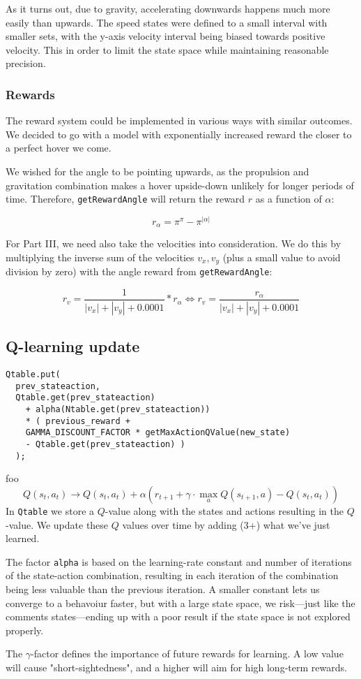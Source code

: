 As it turns out, due to gravity, accelerating downwards happens much more easily than upwards. The speed states were defined to a small interval with smaller sets, with the y-axis velocity interval being biased towards positive velocity. This in order to limit the state space while maintaining reasonable precision.

\subsubsection{Rewards}
The reward system could be implemented in various ways with similar outcomes. We decided to go with a model with exponentially increased reward the closer to a perfect hover we come.

We wished for the angle to be pointing upwards, as the propulsion and gravitation combination makes a hover upside-down unlikely for longer periods of time. Therefore, \verb=getRewardAngle= will return the reward $r$ as a function of $\alpha$:

$$ r_{\alpha} = \pi^{\pi} - \pi^{|\alpha|} $$

For Part III, we need also take the velocities into consideration. We do this by multiplying the inverse sum of the velocities $v_x,v_y$ (plus a small value to avoid division by zero) with the angle reward from \verb=getRewardAngle=:

$$ r_{v} = \frac{1}{|v_x|+|v_y|+0.0001}*r_{\alpha} \Leftrightarrow r_v = \frac{r_{\alpha}}{|v_x|+|v_y|+0.0001} $$

\subsection{Q-learning update}
\lstset{language=Java,numbers=left,breaklines=true,breakatwhitespace=true,keepspaces=true}
\begin{lstlisting}
Qtable.put(
  prev_stateaction,
  Qtable.get(prev_stateaction)
    + alpha(Ntable.get(prev_stateaction))
    * ( previous_reward +
    GAMMA_DISCOUNT_FACTOR * getMaxActionQValue(new_state)
    - Qtable.get(prev_stateaction) )
  );
\end{lstlisting}

foo
$$ Q(s_t,a_t) \rightarrow Q(s_t,a_t)+\alpha \left(r_{t+1}+\gamma\cdot\max_a Q(s_{t+1},a) - Q(s_t,a_t)\right) $$
In \verb=Qtable= we store a $Q$-value along with the states and actions resulting in the $Q$-value. We update these $Q$ values over time by adding (3+) what we've just learned.

The factor \verb=alpha= is based on the learning-rate constant and number of iterations of the state-action combination, resulting in each iteration of the combination being less valuable than the previous iteration. A smaller constant lets us converge to a behavoiur faster, but with a large state space, we risk---just like the comments states---ending up with a poor result if the state space is not explored properly.

The $\gamma$-factor defines the importance of future rewards for learning. A low value will cause "short-sightedness", and a higher will aim for high long-term rewards.
